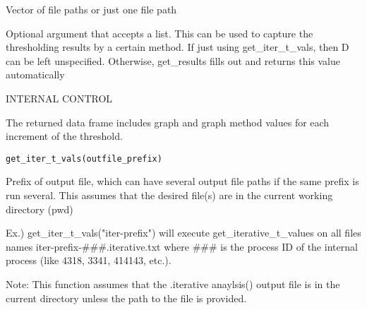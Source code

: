 \documentclass[a4paper]{book}
\begin{document}
%
\begin{Arguments}
\begin{ldescription}
\item[\code{files}] Vector of file paths or just one file path

\item[\code{D}] Optional argument that accepts a list. This can be used
to capture the thresholding results by a certain method. If just
using get\_iter\_t\_vals, then D can be left unspecified. Otherwise,
get\_results fills out and returns this value automatically

\item[\code{d\_min\_t}] INTERNAL CONTROL
\end{ldescription}
\end{Arguments}
%
\begin{Description}
The returned data frame includes graph and graph method values for each 
increment of the threshold.
\end{Description}
%
\begin{Usage}
\begin{verbatim}
get_iter_t_vals(outfile_prefix)
\end{verbatim}
\end{Usage}
%
\begin{Arguments}
\begin{ldescription}
\item[\code{outfile\_prefix}] Prefix of output file, which can have several
output file paths if the same prefix is run several. This assumes
that the desired file(s) are in the current working directory
(pwd)

Ex.) get\_iter\_t\_vals("iter-prefix") will execute get\_iterative\_t\_values
on all files names iter-prefix-\#\#\#.iterative.txt where \#\#\# is the process
ID of the internal process (like 4318, 3341, 414143, etc.).
\end{ldescription}
\end{Arguments}
%
\begin{Description}
Note: This function assumes that the .iterative anaylsis() output file
is in the current directory unless the path to the file is provided.
\end{Description}
\end{document}
